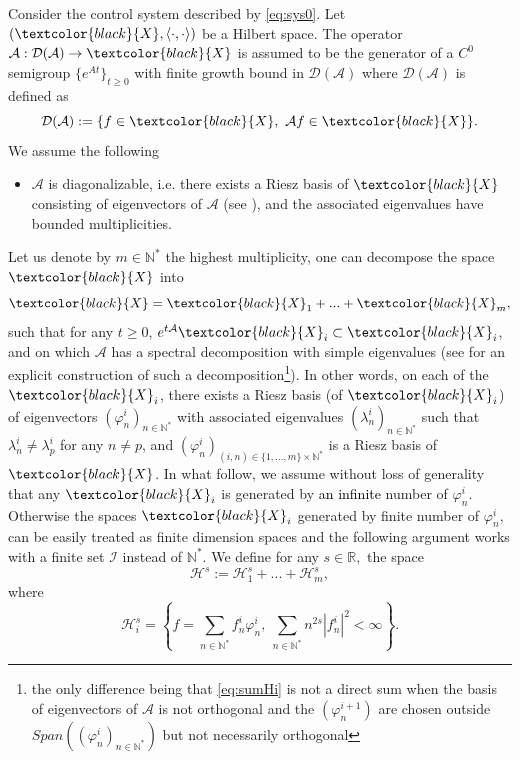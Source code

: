 \documentclass[11pt, dvipsnames]{amsart}
\begin{document}
Consider the control system described by \eqref{eq:sys0}. Let $(\textcolor{black}{X},\langle\cdot,\cdot\rangle)$ be a Hilbert space. The operator $\mathcal{A}: \mathcal{D}(\mathcal{A})\rightarrow \textcolor{black}{X}$ is assumed to be the generator of a $C^0$ semigroup $\{e^{At}\}_{t\geq 0}$ with finite growth bound in $\mathcal{D}(\mathcal{A})$ where $\mathcal{D}(\mathcal{A})$ is defined as 
\begin{equation*}
    \mathcal{D}(\mathcal{A}):=\{f\in \textcolor{black}{X}, \ \mathcal{A}f\in \textcolor{black}{X}\}.
\end{equation*} 
We assume the following
\begin{itemize}
\item[($A_{1}$)] 
$\mathcal{A}$ is diagonalizable, i.e. there exists a Riesz basis of $\textcolor{black}{X}$ consisting of eigenvectors of $\mathcal{A}$ (see \cite{weiss2011eigenvalues}), and the associated eigenvalues have bounded multiplicities.
\end{itemize}
 Let us denote by $m\in\mathbb{N}^{*}$ the highest multiplicity, one can decompose the space $\textcolor{black}{X}$ into
\begin{equation}
\label{eq:sumHi}
    \textcolor{black}{X} = \textcolor{black}{X}_{1}+ ... + \textcolor{black}{X}_{m},
\end{equation}
such that for any $t\geq 0$, $e^{t \mathcal{A}}\textcolor{black}{X}_{i}\subset \textcolor{black}{X}_{i}$, and on which $\mathcal{A}$ has a spectral decomposition with simple eigenvalues (see \cite[Appendix G]{Gagnon2022-fredholm} for an explicit construction of such a decomposition\footnote{the only difference being that \eqref{eq:sumHi} is not a direct sum when the basis of eigenvectors of $\mathcal{A}$ is not orthogonal and the $(\varphi_{n}^{i+1})$ are chosen outside $Span((\varphi_{n}^{i})_{n\in\mathbb{N}^{*}})$ but not necessarily orthogonal}).
 In other words, on each of the $\textcolor{black}{X}_i$, there exists a Riesz basis (of $\textcolor{black}{X}_{i}$) of eigenvectors $(\varphi^{i}_{n})_{n\in\mathbb{N}^{*}}$ with associated eigenvalues $(\lambda_{n}^{i})_{n\in\mathbb{N}^{*}}$ such that $\lambda_{n}^{i}\neq \lambda_{p}^{i}$ for any $n\neq p$, and $(\varphi_{n}^{i})_{(i,n)\in\{1,...,m\}\times\mathbb{N}^{*}}$ is a Riesz basis of $\textcolor{black}{X}$.
In what follow, we assume without loss of generality that any $\textcolor{black}{X}_i$ is generated by \textcolor{black}{an infinite} number of $\varphi_n^i.$ Otherwise the spaces $\textcolor{black}{X}_i$ generated by finite number of $\varphi_n^i,$ can be easily treated as finite dimension spaces \cite{coron2015stabilization} and the following argument works with a finite set $\mathcal{I}$ instead of $\mathbb{N}^{*}$.
We define for any $s\in \mathbb{R},$ the space
\begin{equation*}
\mathcal{H}^{s}:=\mathcal{H}_{1}^{s}+...+\mathcal{H}_{m}^{s},
\end{equation*}
where
\begin{equation*}
\mathcal{H}_{i}^{s}=\left\{f = \sum\limits_{n\in\mathbb{N}^{*}}f_{n}^i
\varphi_{n}^{i}
,\ 
\sum_{n\in \mathbb{N^*}}n^{2s}|f_{n}^i|^{2} 
<\infty\right\}.
\end{equation*} 
\end{document}
